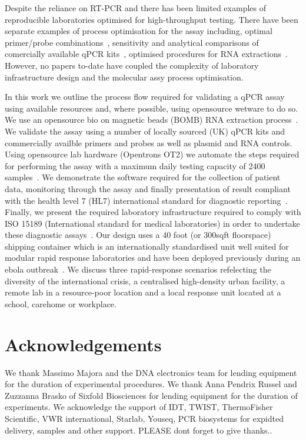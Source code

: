 \documentclass[a4paper,12pt]{article}
\begin{document}
Despite the reliance on RT-PCR and there has been limited examples of reproducible laboratories optimised for high-throughput testing. There have been separate examples of process optimisation for the assay including, optimal primer/probe combinations~\cite{Casto2020}, sensitivity and analytical comparisons of comercially available qPCR kits~\cite{Vogels2020}, optimised procedures for RNA extractions~\cite{Ladha,Grant2020}. However, no papers to-date have coupled the complexity of laboratory infrastructure design and the molecular assy process optimisation. 

In this work we outline the process flow required for validating a qPCR assay using available resources and, where possible, using opensource wetware to do so. We use an opensource bio on magnetic beads (BOMB) RNA extraction process~\cite{Oberacker2019}. We validate the assay using a number of locally sourced (UK) qPCR kits and commercially availble primers and probes as well as plasmid and RNA controls. Using opensource lab hardware (Opentrons OT2) we automate the steps required for performing the assay with a maximum daily testing capacity of 2400 samples~\cite{}. We demonstrate the software required for the collection of patient data, monitoring through the assay and finally presentation of result compliant with the health level 7 (HL7) international standard for diagnostic reporting~\cite{}. Finally, we present the required laboratory infrastructure required to comply with ISO 15189 (International standard for medical laboratories) in order to undertake these diagnostic assays~\cite{}. Our design uses a 40 foot (or 300sqft floorspace) shipping container which is an internationally standardised unit well suited for modular rapid response laboratories and have been deployed previously during an ebola outbreak~\cite{Wolfel2015,Raftery2018,BKosloff2013,Bridges2014}. We discuss three rapid-response scenarios refelecting the diversity of the international crisis, a centralised high-density urban facility, a remote lab in a resource-poor location and a local response unit located at a school, carehome or workplace. 

\section{Acknowledgements}
We thank Massimo Majora and the DNA electronics team for lending equipment for the duration of experimental procedures. We thank Anna Pendrix Russel and Zuzzanna Brasko of Sixfold Biosciences for lending equipment for the duration of experiments. We acknowledge the support of IDT, TWIST, ThermoFisher Scientific, VWR international, Starlab, Youseq, PCR biosystems for expidted delivery, samples and other support. PLEASE dont forget to give thanks.. 



\end{document}
